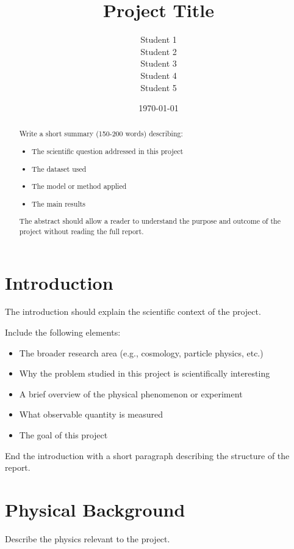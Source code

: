 \documentclass[11pt]{article}
\title{Project Title}
\author{
Student 1 \\
Student 2 \\
Student 3 \\
Student 4 \\
Student 5
}
\date{\today}
\begin{document}
\maketitle

\begin{abstract}

Write a short summary (150-200 words) describing:
\begin{itemize}
\item The scientific question addressed in this project
\item The dataset used
\item The model or method applied
\item The main results
\end{itemize}

The abstract should allow a reader to understand the purpose and
outcome of the project without reading the full report.

\end{abstract}

\tableofcontents
\newpage

\section{Introduction}

The introduction should explain the scientific context of the project.

Include the following elements:
\begin{itemize}
\item The broader research area (e.g., cosmology, particle physics, etc.)
\item Why the problem studied in this project is scientifically interesting
\item A brief overview of the physical phenomenon or experiment
\item What observable quantity is measured
\item The goal of this project
\end{itemize}

End the introduction with a short paragraph describing the structure of the report.

\section{Physical Background}

Describe the physics relevant to the project.
\end{document}
